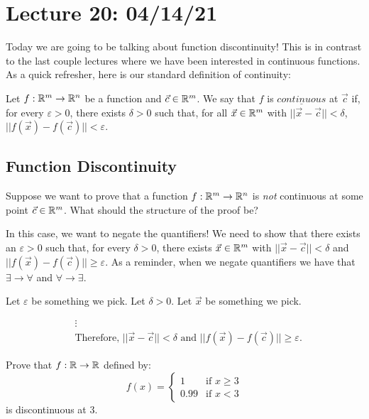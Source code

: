 \section{Lecture 20: 04/14/21}
Today we are going to be talking about function discontinuity! This is in contrast to the last couple lectures where we have been interested in continuous functions.\\

As a quick refresher, here is our standard definition of continuity:
\begin{definition}[Continuity]
Let $f:\mathbb{R}^m \to \mathbb{R}^n$ be a function and $\vec{c} \in \mathbb{R}^m$. We say that $f$ is $\underline{continuous}$ at $\vec{c}$ if, for every $\varepsilon > 0$, there exists $\delta > 0$ such that, for all $\vec{x} \in \mathbb{R}^m$ with $||\vec{x} - \vec{c}|| < \delta$, $||f(\vec{x}) - f(\vec{c})|| < \varepsilon$.
\end{definition}

\subsection{Function Discontinuity}

\begin{example}
Suppose we want to prove that a function $f: \mathbb{R}^m \to \mathbb{R}^n$ is \textit{not} continuous at some point $\vec c \in \mathbb{R}^m$. What should the structure of the proof be?
\end{example}

In this case, we want to negate the quantifiers! We need to show that there exists an $\varepsilon > 0$ such that, for every $\delta > 0$, there exists $\vec x \in \mathbb{R}^m$ with $||\vec x - \vec c|| < \delta$ and $||f(\vec x) - f(\vec c)|| \ge \varepsilon$. As a reminder, when we negate quantifiers we have that $\exists \to \forall$ and $\forall \to \exists$.

Let $\varepsilon$ be something we pick. Let $\delta > 0$. Let $\vec x$ be something we pick.

\begin{align*}
    &\vdots \\
    &\text{Therefore, } ||\vec x - \vec c|| < \delta \text{ and } ||f(\vec x) - f(\vec c)|| \ge \varepsilon.
\end{align*}

\begin{example}
Prove that $f: \mathbb{R} \to \mathbb{R}$ defined by:
\[
f(x) = \begin{cases}
1 & \text{if } x \ge 3 \\
0.99 & \text{if } x < 3
\end{cases}
\]
is discontinuous at $3$.
\end{example}

